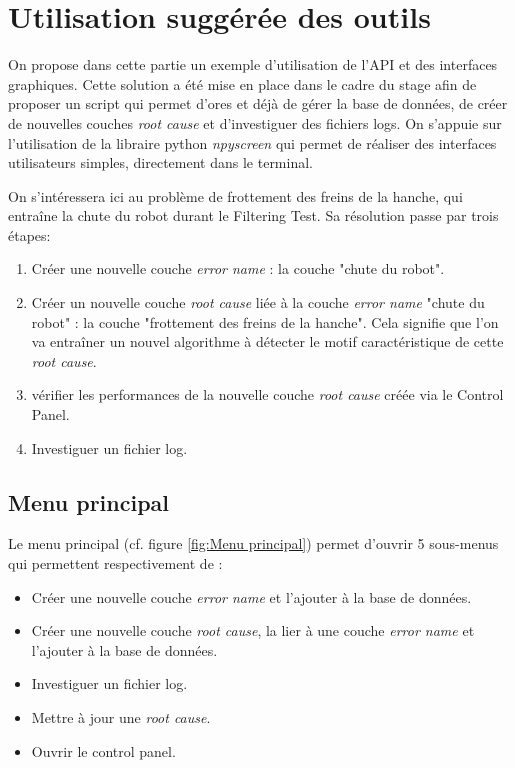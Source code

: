\section{Utilisation suggérée des outils}
\label{Industrialisation du produit: Utilisation suggérée des outils}
On propose dans cette partie un exemple d'utilisation de l'API et des interfaces graphiques. Cette solution a été mise en place dans le cadre du stage afin de proposer un script qui permet d'ores et déjà de gérer la base de données, de créer de nouvelles couches \emph{root cause} et d'investiguer des fichiers logs. On s'appuie sur l'utilisation de la libraire python \emph{npyscreen} \cite{Npyscreen} qui permet de réaliser des interfaces utilisateurs simples, directement dans le terminal.
\newline

On s'intéressera ici au problème de frottement des freins de la hanche, qui entraîne la chute du robot durant le Filtering Test. Sa résolution passe par trois étapes: 
\begin{enumerate}
	\item Créer une nouvelle couche \emph{error name} : la couche "chute du robot". 
	\item Créer un nouvelle couche \emph{root cause} liée à la couche \emph{error name} "chute du robot" : la couche "frottement des freins de la hanche". Cela signifie que l'on va entraîner un nouvel algorithme à détecter le motif caractéristique de cette \emph{root cause}. 
	\item vérifier les performances de la nouvelle couche \emph{root cause} créée via le Control Panel.
	\item Investiguer un fichier log. 
\end{enumerate}

\subsection{Menu principal}
\label{Industrialisation du produit: Utilisation suggérée des outils: Menu principal}
Le menu principal (cf. figure \ref{fig:Menu principal}) permet d'ouvrir 5 sous-menus qui permettent respectivement de :
\begin{itemize}
	\item Créer une nouvelle couche \emph{error name} et l'ajouter à la base de données.
	\item Créer une nouvelle couche \emph{root cause}, la lier à une couche \emph{error name} et l'ajouter à la base de données.
	\item Investiguer un fichier log.
	\item Mettre à jour une \emph{root cause}.
	\item Ouvrir le control panel.
\end{itemize}

